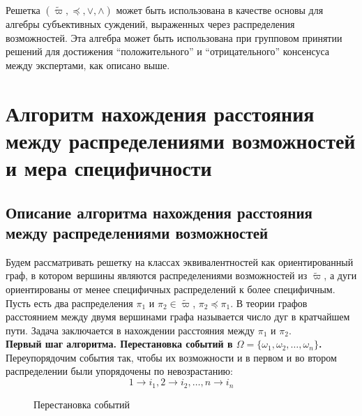 \documentclass[a4paper, 14pt]{extarticle}
\begin{document}
Решетка $(\widetilde{\varpi}, \preceq, \lor, \land)$ может быть использована в качестве основы для алгебры субъективных суждений, выраженных через распределения возможностей. Эта алгебра может быть использована при групповом принятии решений для достижения “положительного” и “отрицательного” консенсуса между экспертами, как описано выше.

\section{Алгоритм нахождения расстояния между распределениями возможностей и мера специфичности}

\subsection{Описание алгоритма нахождения расстояния между распределениями возможностей}

Будем рассматривать решетку на классах эквивалентностей как ориентированный граф, в котором вершины являются распределениями возможностей из $\widetilde{\varpi}$, а дуги ориентированы от менее специфичных распределений к более специфичным. Пусть есть два распределения $\pi_1$ и $\pi_2 \in \widetilde{\varpi}$, $\pi_2 \preceq \pi_1$. В теории графов расстоянием между двумя вершинами графа называется число дуг в кратчайшем пути. Задача заключается в нахождении расстояния между $\pi_1$ и $\pi_2$.\\

\textbf{Первый шаг алгоритма. Перестановка событий в $\Omega = \{ \omega_1, \omega_2, \ldots, \omega_n \}$.} Переупорядочим события так, чтобы их возможности и в первом и во втором распределении были упорядочены по невозрастанию:
\begin{equation}
    1\rightarrow i_1, 2 \rightarrow i_2, \ldots, n \rightarrow i_n
\end{equation}
\begin{figure}[h!]
\caption{Перестановка событий}
\end{figure}
\end{document}
